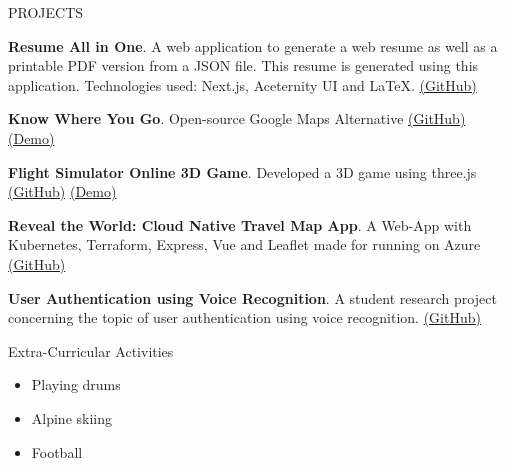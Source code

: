 \documentclass{resume}
\begin{document}
    \begin{rSection}{PROJECTS}
    \vspace{-1.25em}
    
        \item \textbf{Resume All in One}. A web application to generate a web resume as well as a printable PDF version from a JSON file. This resume is generated using this application. Technologies used: Next.js, Aceternity UI and LaTeX. \href{https://github.com/johannesbrandenburger/resume-all-in-one}{(GitHub)} 
        
        \item \textbf{Know Where You Go}. Open-source Google Maps Alternative \href{https://github.com/DHBW-FN-TIT20/know-where-you-go}{(GitHub)} \href{https://know-where-you-go.de}{(Demo)}
        
        \item \textbf{Flight Simulator Online 3D Game}. Developed a 3D game using three.js \href{https://github.com/johannesbrandenburger/flight-simulator-pwa}{(GitHub)} \href{https://flight-simulator.brandenburger.dev}{(Demo)}
        
        \item \textbf{Reveal the World: Cloud Native Travel Map App}. A Web-App with Kubernetes, Terraform, Express, Vue and Leaflet made for running on Azure \href{https://github.com/msi-se/reveal-the-world}{(GitHub)} 
        
        \item \textbf{User Authentication using Voice Recognition}. A student research project concerning the topic of user authentication using voice recognition. \href{https://github.com/DHBW-FN-TIT20/user-authentication-using-voice-recognition}{(GitHub)} 
        
    \end{rSection}

    \begin{rSection}{Extra-Curricular Activities}
    \begin{itemize}
    \item Playing drums
\item Alpine skiing
\item Football
    \end{itemize}
    \end{rSection}

    
\end{document}
